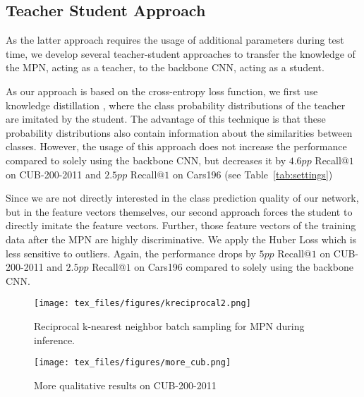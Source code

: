\documentclass{article}
\begin{document}
\subsection{Teacher Student Approach}
As the latter approach requires the usage of additional parameters during test time, we develop several teacher-student approaches to transfer the knowledge of the MPN, acting as a teacher, to the backbone CNN, acting as a student. 

 As our approach is based on the cross-entropy loss function, we first use knowledge distillation \cite{DBLP:journals/corr/HintonVD15}, where the class probability distributions of the teacher are imitated by the student. The advantage of this technique is that these probability distributions also contain information about the similarities between classes. However, the usage of this approach does not increase the performance compared to solely using the backbone CNN, but decreases it by $4.6pp$ Recall@$1$ on CUB-200-2011 and $2.5pp$ Recall@$1$ on Cars196 (see Table~\ref{tab:settings})

 Since we are not directly interested in the class prediction quality of our network, but in the feature vectors themselves, our second approach forces the student to directly imitate the feature vectors. Further, those feature vectors of the training data after the MPN are highly discriminative. We apply the Huber Loss which is less sensitive to outliers. Again, the performance drops by $5pp$ Recall@$1$ on CUB-200-2011 and $2.5pp$ Recall@$1$ on Cars196 compared to solely using the backbone CNN.

\begin{figure}[t]
\begin{center}
\centerline{\texttt{[image: tex\_files/figures/kreciprocal2.png]}}
   \caption{Reciprocal k-nearest neighbor batch sampling for MPN during inference.}
   \end{center}
\label{fig:kreciprocal}
\end{figure}

\begin{figure}[ht]
    \begin{center}
    \centerline{\texttt{[image: tex\_files/figures/more\_cub.png]}}
    \caption{More qualitative results on CUB-200-2011}
    \label{fig:more_cub}
    \end{center}
\end{figure}
\end{document}
